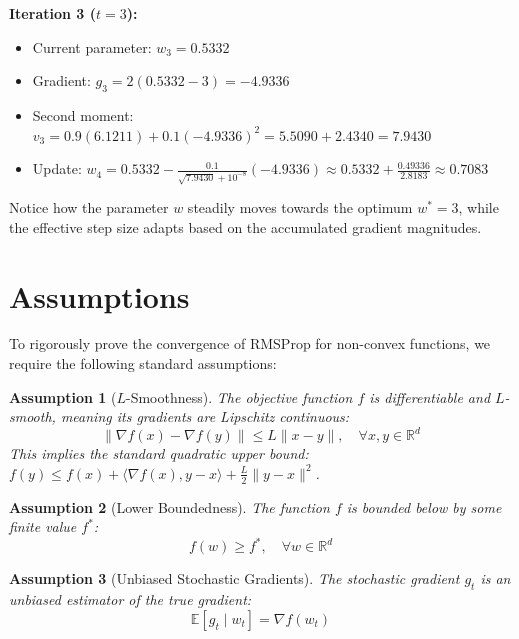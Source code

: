 \documentclass[11pt]{article}
\newtheorem{assumption}{Assumption}
\begin{document}
\textbf{Iteration 3 ($t=3$):}
\begin{itemize}
    \item Current parameter: $w_3 = 0.5332$
    \item Gradient: $g_3 = 2(0.5332 - 3) = -4.9336$
    \item Second moment: $v_3 = 0.9(6.1211) + 0.1(-4.9336)^2 = 5.5090 + 2.4340 = 7.9430$
    \item Update: $w_4 = 0.5332 - \frac{0.1}{\sqrt{7.9430} + 10^{-8}} (-4.9336) \approx 0.5332 + \frac{0.49336}{2.8183} \approx 0.7083$
\end{itemize}
Notice how the parameter $w$ steadily moves towards the optimum $w^* = 3$, while the effective step size adapts based on the accumulated gradient magnitudes.

\section*{Assumptions}
To rigorously prove the convergence of RMSProp for non-convex functions, we require the following standard assumptions:

\begin{assumption}[$L$-Smoothness]
The objective function $f$ is differentiable and $L$-smooth, meaning its gradients are Lipschitz continuous:
\begin{equation*}
    \|\nabla f(x) - \nabla f(y)\| \leq L \|x - y\|, \quad \forall x, y \in \mathbb{R}^d
\end{equation*}
This implies the standard quadratic upper bound: 
$f(y) \leq f(x) + \langle \nabla f(x), y - x \rangle + \frac{L}{2} \|y - x\|^2$.
\end{assumption}

\begin{assumption}[Lower Boundedness]
The function $f$ is bounded below by some finite value $f^*$:
\begin{equation*}
    f(w) \geq f^*, \quad \forall w \in \mathbb{R}^d
\end{equation*}
\end{assumption}

\begin{assumption}[Unbiased Stochastic Gradients]
The stochastic gradient $g_t$ is an unbiased estimator of the true gradient:
\begin{equation*}
    \mathbb{E}[g_t \mid w_t] = \nabla f(w_t)
\end{equation*}
\end{assumption}
\end{document}
